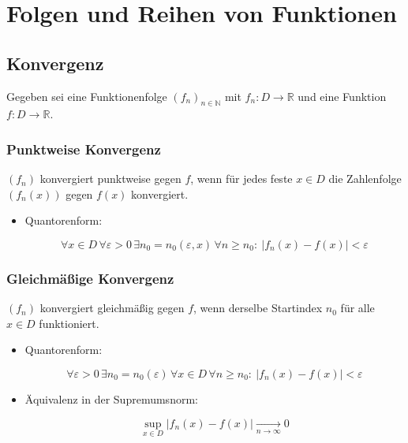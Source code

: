 \documentclass[a4paper,11pt,oneside,open=any,parskip=half, DIV=15]{scrreprt}
\begin{document}
\chapter{Folgen und Reihen von Funktionen}

\section{Konvergenz}

   Gegeben sei eine Funktionenfolge \((f_n)_{n\in\mathbb{N}}\) mit \(f_n:D\to\mathbb{R}\) und eine Funktion \(f:D\to\mathbb{R}\).

   \subsection*{Punktweise Konvergenz}

      \((f_n)\) konvergiert punktweise gegen \(f\), wenn für jedes feste \(x\in D\) die Zahlenfolge \((f_n(x))\) gegen \(f(x)\) konvergiert.

      \begin{itemize}
         \item Quantorenform:
         \begin{importantbox}
            \[
               \forall x\in D\,\forall \varepsilon>0\,\exists n_0=n_0(\varepsilon,x)\,\forall n\ge n_0:
               \ |f_n(x)-f(x)|<\varepsilon
            \]
         \end{importantbox}
      \end{itemize}

   \subsection*{Gleichmäßige Konvergenz}

      \((f_n)\) konvergiert gleichmäßig gegen \(f\), wenn derselbe Startindex \(n_0\) für alle \(x\in D\) funktioniert.

      \begin{itemize}
         \item Quantorenform:
            \begin{importantbox}
               \[
                  \forall \varepsilon>0\,\exists n_0=n_0(\varepsilon)\,\forall x\in D\,\forall n\ge n_0:
                  \ |f_n(x)-f(x)|<\varepsilon
               \]
            \end{importantbox}
         \item Äquivalenz in der Supremumsnorm:
            \begin{importantbox}
               \[
               \sup_{x\in D}|f_n(x)-f(x)|\xrightarrow[n\to\infty]{}0
               \]
               \end{importantbox}
      \end{itemize}
\end{document}
